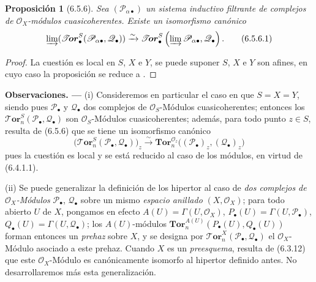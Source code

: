\documentclass[10pt,oneside,openany]{book}
\makeatletter
\theoremstyle{egaenv}\newtheorem*{env}{---}
\theoremstyle{egastatement}
\newtheorem*{proposition}{Proposición}
\theoremstyle{egadescription}
\newenvironment{namedtheorem}[2][]{\par\medskip\noindent\setmanualcurrentlabel{#1}\textbf{#2\ifstrempty{#1}{}{ (#1)}. ---}\ifstrequal{#2}{Observación}{\normalfont}{\ifstrequal{#2}{Observaciones}{\normalfont}{\itshape}}}{\par\medskip}
\newcommand{\setmanualcurrentlabel}[1]{\def\@currentlabel{#1}}
\makeatother
\begin{document}
\begin{proposition}[6.5.6]
\label{III.6.5.6}
Sea $(\mathscr P_{\alpha\bullet})$ un sistema inductivo filtrante de
complejos de $\mathscr O_X$-módulos cuasicoherentes. Existe un
isomorfismo canónico
\[
  \varinjlim
  (\boldsymbol{\mathscr{T}\!or}_\bullet^S
  (\mathscr P_{\alpha\bullet},\mathscr Q_\bullet))
  \xrightarrow{\sim}
  \boldsymbol{\mathscr{T}\!or}_\bullet^S
  \left(\varinjlim\mathscr P_{\alpha\bullet},\mathscr Q_\bullet\right).
  \tag{6.5.6.1}\label{III.6.5.6.1.fr}
\]
\end{proposition}

\begin{proof}
La cuestión es local en $S$, $X$ e $Y$, se puede suponer $S$, $X$ e $Y$ son afines, en cuyo caso la proposición
se reduce a .
\end{proof}

\begin{namedtheorem}[6.5.7]{Observaciones}
\textnormal{(i)} Consideremos en particular el caso en que $S=X=Y$,
siendo pues $\mathscr P_\bullet$ y $\mathscr Q_\bullet$ dos complejos de
$\mathscr O_S$-Módulos cuasicoherentes; entonces los
$\boldsymbol{\mathscr{T}\!or}_n^S(\mathscr P_\bullet,\mathscr Q_\bullet)$ son
$\mathscr O_S$-Módulos cuasicoherentes; además, para todo punto $z\in S$,
resulta de (6.5.6) que se tiene un isomorfismo canónico
\[
  \bigl(\boldsymbol{\mathscr{T}\!or}_n^S
    (\mathscr P_\bullet,\mathscr Q_\bullet)\bigr)_z
  \xrightarrow{\sim}
  \mathbf{Tor}_n^{\mathscr O_z}
  \bigl((\mathscr P_\bullet)_z,(\mathscr Q_\bullet)_z\bigr)
  \tag{6.5.7.1}\label{III.6.5.7.1.fr}
\]
pues la cuestión es local y se está reducido al caso de los módulos, en virtud de
(6.4.1.1).

\textnormal{(ii)} Se puede generalizar la definición de los hipertor al caso de
\emph{dos complejos de $\mathscr O_X$-Módulos} $\mathscr P_\bullet$,
$\mathscr Q_\bullet$ sobre un mismo \emph{espacio anillado} $(X,\mathscr O_X)$; para todo
abierto $U$ de $X$, pongamos en efecto
$A(U)=\Gamma(U,\mathscr O_X)$,
$P_\bullet(U)=\Gamma(U,\mathscr P_\bullet)$,
$Q_\bullet(U)=\Gamma(U,\mathscr Q_\bullet)$; los $A(U)$-módulos
$\mathbf{Tor}_n^{A(U)}(P_\bullet(U),Q_\bullet(U))$
forman entonces un \emph{prehaz} sobre $X$, y se designa por
$\boldsymbol{\mathscr{T}\!or}_n^X(\mathscr P_\bullet,\mathscr Q_\bullet)$ el
$\mathscr O_X$-Módulo asociado a este prehaz. Cuando $X$ es un \emph{preesquema},
resulta de (6.3.12) que este $\mathscr O_X$-Módulo es canónicamente isomorfo
al hipertor definido antes. No desarrollaremos más esta
generalización.
\end{namedtheorem}
\end{document}
